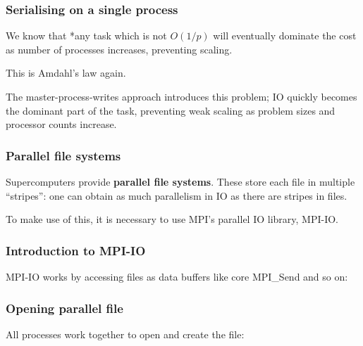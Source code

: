 \subsubsection{Serialising on a single
process}\label{serialising-on-a-single-process}

We know that *any task which is not $O(1/p)$ will eventually dominate
the cost as number of processes increases, preventing scaling.

This is Amdahl's law again.

The master-process-writes approach introduces this problem; IO quickly
becomes the dominant part of the task, preventing weak scaling as
problem sizes and processor counts increase.

\subsubsection{Parallel file systems}\label{parallel-file-systems}

Supercomputers provide \textbf{parallel file systems}. These store each
file in multiple ``stripes'': one can obtain as much parallelism in IO
as there are stripes in files.

To make use of this, it is necessary to use MPI's parallel IO library,
MPI-IO.

\subsubsection{Introduction to MPI-IO}\label{introduction-to-mpi-io}

MPI-IO works by accessing files as data buffers like core MPI\_Send and
so on:

\begin{Shaded}
\begin{Highlighting}[]

\end{Highlighting}
\end{Shaded}

\subsubsection{Opening parallel file}\label{opening-parallel-file}

All processes work together to open and create the file:

\begin{Shaded}
\begin{Highlighting}[]

  \NormalTok{<} 
\end{Highlighting}
\end{Shaded}

